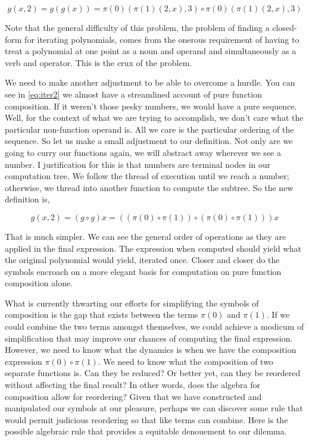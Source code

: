 \begin{equation}
    g(x,2) = g(g(x)) = \pi(0)(\pi(1)(2,x), 3) \circ \pi(0)(\pi(1)(2,x), 3)
    \label{eq:iter2}
\end{equation}

Note that the general difficulty of this problem, the problem of finding a
closed-form for iterating polynomials, comes from the onerous requirement of
having to treat a polynomial at one point as a noun and operand and
simultaneously as a verb and operator. This is the crux of the problem.

We need to make another adjustment to be able to overcome a hurdle. You can see
in \ref{eq:iter2} we almost have a streamlined account of pure function
composition. If it weren't those pesky numbers, we would have a pure sequence.
Well, for the context of what we are trying to accomplish, we don't care what
the particular non-function operand is. All we care is the particular ordering
of the sequence. So let us make a small adjustment to our definition. Not only
are we going to curry our functions again, we will abstract away wherever we
see a number. I justification for this is that numbers are terminal nodes in
our computation tree. We follow the thread of execution until we reach a
number; otherwise, we thread into another function to compute the subtree. So
the new definition is,

\begin{equation}
    g(x,2) = (g \circ g) x = ((\pi(0) \circ \pi(1)) \circ (\pi(0) \circ \pi(1))) x
    \label{eq:iter3}
\end{equation}

That is much simpler. We can see the general order of operations as they are
applied in the final expression. The expression when computed should yield what
the original polynomial would yield, iterated once. Closer and closer do the
symbols encroach on a more elegant basis for computation on pure function
composition alone.

What is currently thwarting our efforts for simplifying the symbols of
composition is the gap that exists between the terms $\pi(0)$ and $\pi(1)$. If
we could combine the two terms amongst themselves, we could achieve a modicum
of simplification that may improve our chances of computing the final
expression. However, we need to know what the dynamics is when we have the
composition expression $\pi(0) \circ \pi(1)$. We need to know what the
composition of two separate functions is. Can they be reduced? Or better yet,
can they be reordered without affecting the final result? In other words, does
the algebra for composition allow for reordering? Given that we have
constructed and manipulated our symbols at our pleasure, perhaps we can
discover some rule that would permit judicious reordering so that like terms
can combine. Here is the possible algebraic rule that provides a equitable
denouement to our dilemma.

